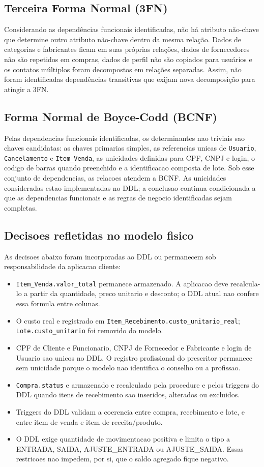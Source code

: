 \documentclass[12pt,a4paper]{article}
\begin{document}
\subsection{Terceira Forma Normal (3FN)}
Considerando as dependências funcionais identificadas, não há atributo não-chave que determine outro atributo não-chave dentro da mesma relação. Dados de categorias e fabricantes ficam em suas próprias relações, dados de fornecedores não são repetidos em compras, dados de perfil não são copiados para usuários e os contatos múltiplos foram decompostos em relações separadas. Assim, não foram identificadas dependências transitivas que exijam nova decomposição para atingir a 3FN.

\subsection{Forma Normal de Boyce-Codd (BCNF)}
Pelas dependencias funcionais identificadas, os determinantes nao triviais sao chaves candidatas: as chaves primarias simples, as referencias unicas de \texttt{Usuario}, \texttt{Cancelamento} e \texttt{Item\_Venda}, as unicidades definidas para CPF, CNPJ e login, o codigo de barras quando preenchido e a identificacao composta de lote. Sob esse conjunto de dependencias, as relacoes atendem a BCNF. As unicidades consideradas estao implementadas no DDL; a conclusao continua condicionada a que as dependencias funcionais e as regras de negocio identificadas sejam completas.

\subsection{Decisoes refletidas no modelo fisico}
As decisoes abaixo foram incorporadas ao DDL ou permanecem sob responsabilidade da aplicacao cliente:
\begin{itemize}
\item \texttt{Item\_Venda.valor\_total} permanece armazenado. A aplicacao deve recalcula-lo a partir da quantidade, preco unitario e desconto; o DDL atual nao confere essa formula entre colunas.
\item O custo real e registrado em \texttt{Item\_Recebimento.custo\_unitario\_real}; \texttt{Lote.custo\_unitario} foi removido do modelo.
\item CPF de Cliente e Funcionario, CNPJ de Fornecedor e Fabricante e login de Usuario sao unicos no DDL. O registro profissional do prescritor permanece sem unicidade porque o modelo nao identifica o conselho ou a profissao.
\item \texttt{Compra.status} e armazenado e recalculado pela procedure e pelos triggers do DDL quando itens de recebimento sao inseridos, alterados ou excluidos.
\item Triggers do DDL validam a coerencia entre compra, recebimento e lote, e entre item de venda e item de receita/produto.
\item O DDL exige quantidade de movimentacao positiva e limita o tipo a ENTRADA, SAIDA, AJUSTE\_ENTRADA ou AJUSTE\_SAIDA. Essas restricoes nao impedem, por si, que o saldo agregado fique negativo.
\end{itemize}
\end{document}
